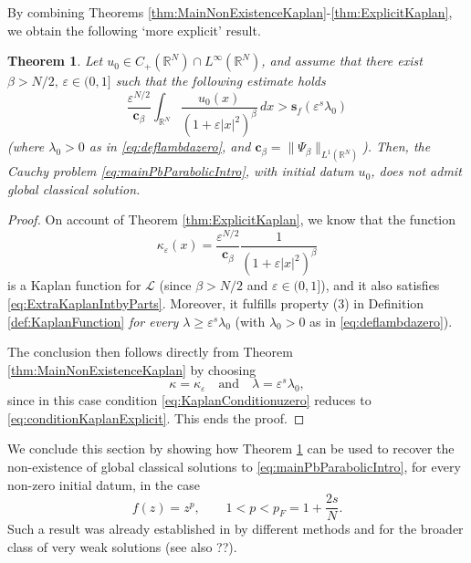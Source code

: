 \documentclass[11pt,a4paper,reqno]{amsart}
\def \R {\mathbb{R}}
\def \e {\varepsilon}
\def \LL {\mathcal{L}}
\theoremstyle{definition}
\theoremstyle{plain}
\newtheorem{theorem}[definition]{Theorem}
\numberwithin{equation}{section}
\begin{document}
By combining Theorems \ref{thm:MainNonExistenceKaplan}-\ref{thm:ExplicitKaplan},
we obtain the following `more explicit' result.
\begin{theorem} \label{thm:NonexistenceExplicit}
	Let $u_0\in C_+(\mathbb{R}^N)\cap L^\infty(\mathbb{R}^N)$, and assume that there exist $\beta > N/2,\,\e\in(0,1]$ such that the following
	estimate holds
	\begin{equation} \label{eq:conditionKaplanExplicit}
		\frac{\e^{N/2}}{\mathbf{c}_\beta}\int_{\R^N}\frac{u_0(x)}{(1+\e|x|^2)^\beta}\,dx >\mathbf{s}_f(\e^s\lambda_0)
	\end{equation}
	\emph{(}where $\lambda_0 > 0$ as in \eqref{eq:deflambdazero}, and
	$\mathbf{c}_\beta = \|\Psi_\beta\|_{L^1(\R^N)}$\emph{)}. Then, the Cauchy problem \eqref{eq:mainPbParabolicIntro}, with initial datum $u_0$, does not admit global classical solution.
\end{theorem}
\begin{proof}
	On account of Theorem \ref{thm:ExplicitKaplan}, we know that the function
	$$\kappa_\e(x) = \frac{\e^{N/2}}{\mathbf{c}_\beta}\frac{1}{(1+\e|x|^2)^\beta}$$
	is a Kaplan function for  $\LL$ (since $\beta > N/2$ and $\e\in(0,1]$), and it also satisfies \eqref{eq:ExtraKaplanIntbyParts}. Moreover, it fulfills property (3) in De\-fi\-nition \ref{def:KaplanFunction} \emph{for every  $\lambda \geq \e^s\lambda_0$} (with $\lambda_0 > 0$
	as in \eqref{eq:deflambdazero}).
	
	The conclusion then follows directly
	from Theorem \ref{thm:MainNonExistenceKaplan} by choosing
	$$\kappa = \kappa_\e \quad\text{and}\quad \lambda = \e^s\lambda_0,$$
    since in this case condition \eqref{eq:KaplanConditionuzero} reduces
    to \eqref{eq:conditionKaplanExplicit}. This ends the proof.
	\end{proof}
We conclude this section by showing how Theorem \ref{thm:NonexistenceExplicit} can be used to recover the non-exi\-stence of global classical solutions to \eqref{eq:mainPbParabolicIntro}, for every non-zero initial datum, in the case
$$
f(z) = z^p, \qquad 1<p<p_F = 1+\frac{2s}{N}.
$$
Such a result was already established in \cite{BPV} by different methods and for the broader class of very weak solutions (see also ??).
\end{document}
